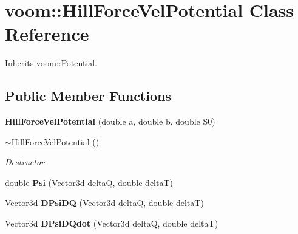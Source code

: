 \hypertarget{classvoom_1_1_hill_force_vel_potential}{
\section{voom::HillForceVelPotential Class Reference}
\label{classvoom_1_1_hill_force_vel_potential}
}


Inherits \hyperlink{classvoom_1_1_potential}{voom::Potential}.\subsection*{Public Member Functions}
\begin{DoxyCompactItemize}
\item 
\hypertarget{classvoom_1_1_hill_force_vel_potential_a9f43b89f6fff561e84001398efacc261}{
{\bfseries HillForceVelPotential} (double a, double b, double S0)}
\label{classvoom_1_1_hill_force_vel_potential_a9f43b89f6fff561e84001398efacc261}

\item 
\hypertarget{classvoom_1_1_hill_force_vel_potential_a636a462b2d1508d93cdb55e2eaae7786}{
\hyperlink{classvoom_1_1_hill_force_vel_potential_a636a462b2d1508d93cdb55e2eaae7786}{$\sim$HillForceVelPotential} ()}
\label{classvoom_1_1_hill_force_vel_potential_a636a462b2d1508d93cdb55e2eaae7786}

\begin{DoxyCompactList}\small\item\em Destructor. \item\end{DoxyCompactList}\item 
\hypertarget{classvoom_1_1_hill_force_vel_potential_aba5516954a86fcd4143107417aafcb5c}{
double {\bfseries Psi} (Vector3d deltaQ, double deltaT)}
\label{classvoom_1_1_hill_force_vel_potential_aba5516954a86fcd4143107417aafcb5c}

\item 
\hypertarget{classvoom_1_1_hill_force_vel_potential_a54b6147ac908dd625f8de188cc30c80d}{
Vector3d {\bfseries DPsiDQ} (Vector3d deltaQ, double deltaT)}
\label{classvoom_1_1_hill_force_vel_potential_a54b6147ac908dd625f8de188cc30c80d}

\item 
\hypertarget{classvoom_1_1_hill_force_vel_potential_ac2ffb5f0292684c6f0b443f339382734}{
Vector3d {\bfseries DPsiDQdot} (Vector3d deltaQ, double deltaT)}
\label{classvoom_1_1_hill_force_vel_potential_ac2ffb5f0292684c6f0b443f339382734}


\end{DoxyCompactItemize}
